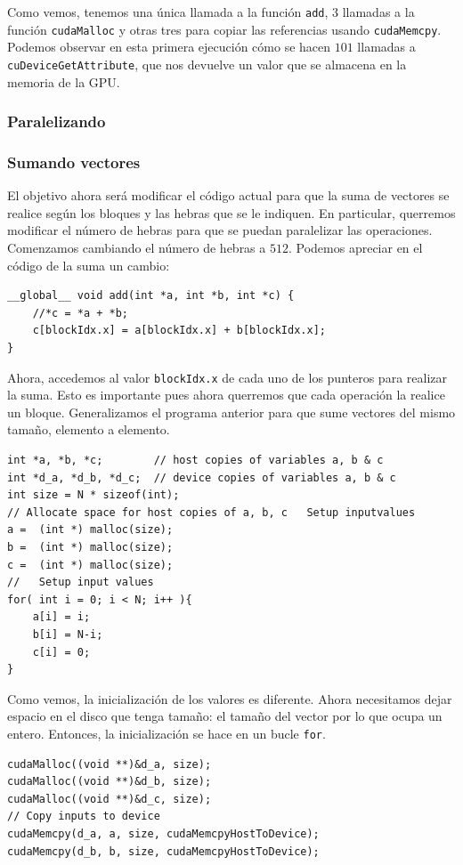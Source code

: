 \documentclass[11pt]{article}
\def\inline{\lstinline[basicstyle=\ttfamily,keywordstyle={}]}
\theoremstyle{plain}
\begin{document}
Como vemos, tenemos una única llamada a la función \inline{add}, $3$ llamadas a la función \inline{cudaMalloc} y otras tres para copiar las referencias usando \inline{cudaMemcpy}. Podemos observar en esta primera ejecución cómo se hacen $101$ llamadas a \inline{cuDeviceGetAttribute}, que nos devuelve un valor que se almacena en la memoria de la GPU.

\subsubsection{Paralelizando}
\subsubsection*{Sumando vectores}

El objetivo ahora será modificar el código actual para que la suma de vectores se realice según los bloques y las hebras que se le indiquen. En particular, querremos modificar el número de hebras para que se puedan paralelizar las operaciones. Comenzamos cambiando el número de hebras a $512$. Podemos apreciar en el código de la suma un cambio:
\begin{verbatim}
__global__ void add(int *a, int *b, int *c) {
    //*c = *a + *b;
    c[blockIdx.x] = a[blockIdx.x] + b[blockIdx.x];
}
\end{verbatim}

Ahora, accedemos al valor \inline{blockIdx.x} de cada uno de los punteros para realizar la suma. Esto es importante pues ahora querremos que cada operación la realice un bloque. Generalizamos el programa anterior para que sume vectores del mismo tamaño, elemento a elemento.

\begin{verbatim}
int *a, *b, *c;        // host copies of variables a, b & c
int *d_a, *d_b, *d_c;  // device copies of variables a, b & c
int size = N * sizeof(int);
// Allocate space for host copies of a, b, c   Setup inputvalues  
a =  (int *) malloc(size); 
b =  (int *) malloc(size); 
c =  (int *) malloc(size); 
//   Setup input values  
for( int i = 0; i < N; i++ ){
	a[i] = i;
  	b[i] = N-i;
	c[i] = 0;
}	
\end{verbatim}

Como vemos, la inicialización de los valores es diferente. Ahora necesitamos dejar espacio en el disco que tenga tamaño: el tamaño del vector por lo que ocupa un entero. Entonces, la inicialización se hace en un bucle \inline{for}.

\begin{verbatim}
cudaMalloc((void **)&d_a, size);
cudaMalloc((void **)&d_b, size);
cudaMalloc((void **)&d_c, size);
// Copy inputs to device
cudaMemcpy(d_a, a, size, cudaMemcpyHostToDevice);
cudaMemcpy(d_b, b, size, cudaMemcpyHostToDevice);
\end{verbatim}
\end{document}
